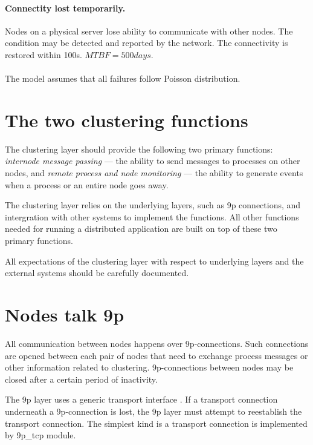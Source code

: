 \documentclass{scrartcl}
\begin{document}
\paragraph{Connectity lost temporarily.} Nodes on a physical server lose ability
to communicate with other nodes. The condition may be detected and reported by
the network. The connectivity is restored within 100s. $MTBF = 500days$. 

\paragraph{} The model assumes that all failures follow Poisson distribution.

\section*{The two clustering functions}

The clustering layer should provide the following two primary functions:
\emph{internode message passing} --- the ability to send messages to processes
on other nodes, and \emph{remote process and node monitoring} --- the ability to
generate events when a process or an entire node goes away.

The clustering layer relies on the underlying layers, such as 9p connections,
and intergration with other systems to implement the functions. All other
functions needed for running a distributed application are built on top of these
two primary functions.

All expectations of the clustering layer with respect to underlying layers and
the external systems should be carefully documented.

\section*{Nodes talk 9p}

All communication between nodes happens over 9p-connections. Such connections
are opened between each pair of nodes that need to exchange process messages or
other information related to clustering. 9p-connections between nodes may be
closed after a certain period of inactivity.

The 9p layer uses a generic transport interface \cite{9pfs}. If a transport
connection underneath a 9p-connection is lost, the 9p layer must attempt to
reestablish the transport connection. The simplest kind is a transport
connection is implemented by 9p\_tcp module.
\end{document}
